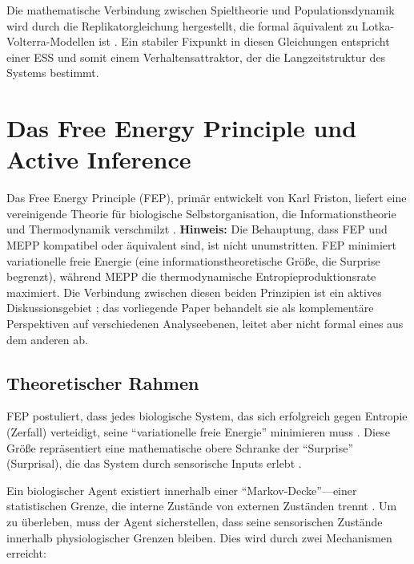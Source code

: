 \documentclass[12pt,a4paper]{article}
\theoremstyle{remark}
\begin{document}
Die mathematische Verbindung zwischen Spieltheorie und Populationsdynamik wird durch die Replikatorgleichung hergestellt, die formal \"aquivalent zu Lotka-Volterra-Modellen ist \citep{CoexistenceLotkaVolterra}. Ein stabiler Fixpunkt in diesen Gleichungen entspricht einer ESS und somit einem Verhaltensattraktor, der die Langzeitstruktur des Systems bestimmt.

\section{Das Free Energy Principle und Active Inference}
\label{sec:fep}

Das Free Energy Principle (FEP), prim\"ar entwickelt von Karl Friston, liefert eine vereinigende Theorie f\"ur biologische Selbstorganisation, die Informationstheorie und Thermodynamik verschmilzt \citep{FristonFreeEnergy,FristonPDF}. \textbf{Hinweis:} Die Behauptung, dass FEP und MEPP kompatibel oder \"aquivalent sind, ist nicht unumstritten. FEP minimiert variationelle freie Energie (eine informationstheoretische Gr\"o\ss{}e, die Surprise begrenzt), w\"ahrend MEPP die thermodynamische Entropieproduktionsrate maximiert. Die Verbindung zwischen diesen beiden Prinzipien ist ein aktives Diskussionsgebiet \citep{FristonFreeEnergy}; das vorliegende Paper behandelt sie als komplement\"are Perspektiven auf verschiedenen Analyseebenen, leitet aber nicht formal eines aus dem anderen ab.

\subsection{Theoretischer Rahmen}

FEP postuliert, dass jedes biologische System, das sich erfolgreich gegen Entropie (Zerfall) verteidigt, seine ``variationelle freie Energie'' minimieren muss \citep{FristonFreeEnergy}. Diese Gr\"o\ss{}e repr\"asentiert eine mathematische obere Schranke der ``Surprise'' (Surprisal), die das System durch sensorische Inputs erlebt \citep{FristonFreeEnergy}.

Ein biologischer Agent existiert innerhalb einer ``Markov-Decke''---einer statistischen Grenze, die interne Zust\"ande von externen Zust\"anden trennt \citep{FristonPDF}. Um zu \"uberleben, muss der Agent sicherstellen, dass seine sensorischen Zust\"ande innerhalb physiologischer Grenzen bleiben. Dies wird durch zwei Mechanismen erreicht:
\end{document}
